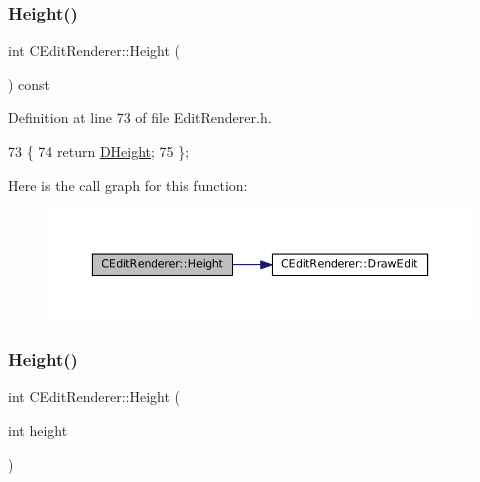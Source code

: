 \subsubsection{\texorpdfstring{Height()}{Height()}\hspace{0.1cm}{\footnotesize\ttfamily [1/2]}}
{\footnotesize\ttfamily int C\+Edit\+Renderer\+::\+Height (\begin{DoxyParamCaption}{ }\end{DoxyParamCaption}) const\hspace{0.3cm}{\ttfamily [inline]}}



Definition at line 73 of file Edit\+Renderer.\+h.


\begin{DoxyCode}
73                           \{
74             \textcolor{keywordflow}{return} \hyperlink{classCEditRenderer_ade8dedb4f9790d28b38da8ef20a171cb}{DHeight};    
75         \};
\end{DoxyCode}
Here is the call graph for this function\+:\nopagebreak
\begin{figure}[H]
\begin{center}
\leavevmode
\includegraphics[width=350pt]{classCEditRenderer_ad5ad32a8ae2372e21bb9365a6b6d0f59_cgraph}
\end{center}
\end{figure}
\hypertarget{classCEditRenderer_ab3c2442f35049d3fa57a173e68043bfa}{}\label{classCEditRenderer_ab3c2442f35049d3fa57a173e68043bfa} 
\subsubsection{\texorpdfstring{Height()}{Height()}\hspace{0.1cm}{\footnotesize\ttfamily [2/2]}}
{\footnotesize\ttfamily int C\+Edit\+Renderer\+::\+Height (\begin{DoxyParamCaption}\item[{int}]{height }\end{DoxyParamCaption})}



